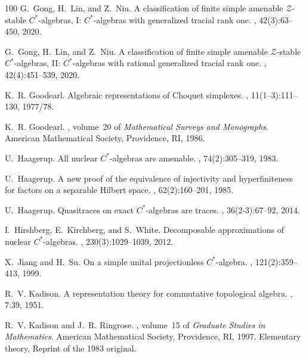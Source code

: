\documentclass[a4paper,11pt]{amsart}
\theoremstyle{definition}
\numberwithin{equation}{section}
\numberwithin{theorem}{section}
\begin{document}
\begin{thebibliography}{100}
G.~Gong, H.~Lin, and Z.~Niu.
\newblock A classification of finite simple amenable {$\mathcal{Z}$}-stable
  {$C^*$}-algebras, {I}: {$C^*$}-algebras with generalized tracial rank one.
, 42(3):63--450, 2020.

G.~Gong, H.~Lin, and Z.~Niu.
\newblock A classification of finite simple amenable {$\mathcal{Z}$}-stable
  {$C^*$}-algebras, {II}: {$C^*$}-algebras with rational generalized tracial
  rank one.
, 42(4):451--539, 2020.

K.~R. Goodearl.
\newblock Algebraic representations of {C}hoquet simplexes.
, 11(1--3):111--130, 1977/78.

K.~R. Goodearl.
, volume~20
  of {\em Mathematical Surveys and Monographs}.
\newblock American Mathematical Society, Providence, RI, 1986.

U.~Haagerup.
\newblock All nuclear {$C^*$}-algebras are amenable.
, 74(2):305--319, 1983.

U.~Haagerup.
\newblock A new proof of the equivalence of injectivity and hyperfiniteness for
  factors on a separable {H}ilbert space.
, 62(2):160--201, 1985.

U.~Haagerup.
\newblock Quasitraces on exact {$C^*$}-algebras are traces.
, 36(2-3):67--92, 2014.

I.~Hirshberg, E.~Kirchberg, and S.~White.
\newblock Decomposable approximations of nuclear {$C^*$}-algebras.
, 230(3):1029--1039, 2012.

X.~Jiang and H.~Su.
\newblock On a simple unital projectionless {$C^*$}-algebra.
, 121(2):359--413, 1999.

R.~V. Kadison.
\newblock A representation theory for commutative topological algebra.
, 7:39, 1951.

R.~V. Kadison and J.~R. Ringrose.
,
  volume~15 of {\em Graduate Studies in Mathematics}.
\newblock American Mathematical Society, Providence, RI, 1997.
\newblock Elementary theory, Reprint of the 1983 original.


\end{thebibliography}
\end{document}
